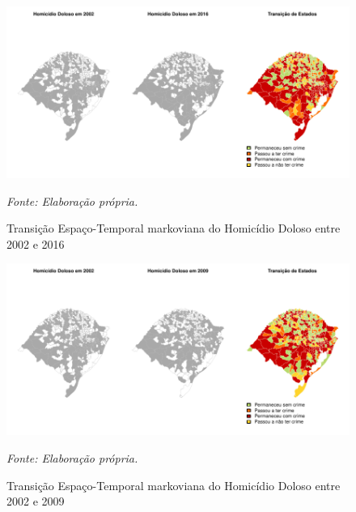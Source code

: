 \documentclass[12pt,openright,oneside,a4paper,english,french,spanish]{abntex2}
\numberwithin{table}{section} %
\numberwithin{figure}{section} %
\newcommand{\source}[1]{\textit{#1}}
\begin{document}
\begin{subappendices}
\begin{figure}[H]
\begin{center}
\includegraphics{TESE_DE_DOUTORADO_RENAN_FINAL-map_hom_dol_2002_2016}
\end{center}
\caption{Transição Espaço-Temporal markoviana do Homicídio Doloso entre 2002 e 2016}
\source{Fonte: Elaboração própria.}
\label{fig:mapas_hom_dol_markov_2002_2016}
\end{figure}


\begin{figure}[H]
\begin{center}
\includegraphics{TESE_DE_DOUTORADO_RENAN_FINAL-map_hom_dol_2002_2009}
\end{center}
\caption{Transição Espaço-Temporal markoviana do Homicídio Doloso entre 2002 e 2009}
\source{Fonte: Elaboração própria.}
\label{fig:mapas_hom_dol_markov_2002_2009}
\end{figure}


\end{subappendices}
\end{document}
